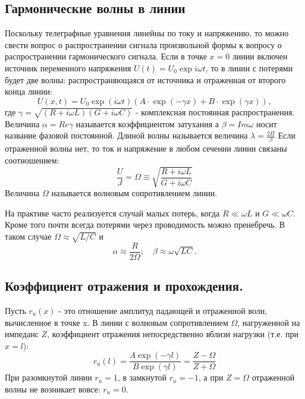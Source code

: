 \documentclass[a4paper,14pt]{extarticle}
\begin{document}
		 \subsection{Гармонические волны в линии}
		 	Поскольку телеграфные уравнения линейны по току и напряжению, то можно свести вопрос о распространении сигнала произвольной формы к вопросу о распространении гармонического сигнала. Если в точке $x = 0$ линии включен источник переменного напряжения $U(t) = U_0 \exp{i \omega t}$, то в линии с потерями будет две волны: распространяющаяся от источника и отраженная от второго конца линии:
		 	\begin{equation}
		 		U(x,t) = U_0 \exp{(i \omega t)} (A \cdot \exp{(-\gamma x)} + B \cdot \exp{(\gamma x)}),
		 	\end{equation}
		 	где $\gamma = \sqrt{(R + i \omega L)(G + i \omega C)}$ - комплексная постоянная распространения. Величина $\alpha = Re{\gamma}$ называется коэффициентом затухания а $\beta = Im{\omega}$ носит название фазовой постоянной. Длиной волны называется величина $\lambda = \frac{2 \Pi}{\beta}$
		 	\newline
		 	Если отраженной волны нет, то ток и напряжение в любом сечении линии связаны соотношением:
		 	\begin{equation}
		 		\frac{U}{J} = \Omega \equiv \sqrt{\frac{R+ i \omega L}{G + i \omega C}}
		 	\end{equation}
		 	Величина $\Omega$ называется волновым сопротивлением линии.
		 	
		 	На практике часто реализуется случай малых потерь, когда $R \ll \omega L$ и $G \ll \omega C$. Кроме того почти всегда потерями через проводимость можно пренебречь. В таком случае $\Omega \approx \sqrt{L / C}$ и
		 	\begin{equation}
		 		\alpha \approx \frac{R}{2 \Omega}; \quad \beta \approx \omega \sqrt{L C}.
		 	\end{equation}
		 \subsection{Коэффициент отражения и прохождения.}
		 	Пусть $r_u(x)$ - это отношение амплитуд падающей и отраженной волн, вычисленное в точке x. В линии с волновым сопротивлением $\Omega$, нагруженной на импеданс $Z$, коэффициент отражения непосредственно вблизи нагрузки (т.е. при $x = l$):
		 	\begin{equation}
		 		r_u(l) = \frac{A \exp{(-\gamma l)}}{B \exp{(\gamma l)}} = \frac{Z - \Omega}{Z + \Omega}
		 	\end{equation}
		 	При разомкнутой линии $r_u = 1$, в замкнутой $r_u = -1 $, а при $Z = \Omega$ отраженной волны не возникает вовсе: $r_u = 0$.
\end{document}
